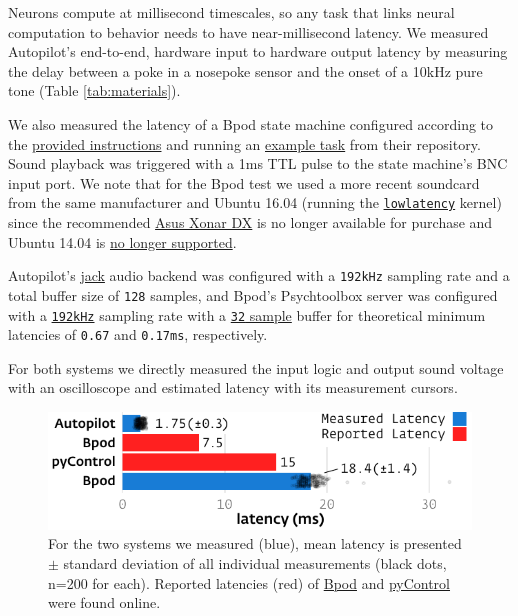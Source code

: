 Neurons compute at millisecond timescales, so any task that links neural computation to behavior needs to have near-millisecond latency. We measured Autopilot's end-to-end, hardware input to hardware output latency by measuring the delay between a poke in a nosepoke sensor and the onset of a 10kHz pure tone (Table \ref{tab:materials}). 

We also measured the latency of a Bpod state machine configured according to the \href{https://sites.google.com/site/bpoddocumentation/installing-bpod/ubuntu14}{provided instructions} and running an \href{https://github.com/sanworks/Bpod_Gen2/blob/master/Examples/Protocols/PsychToolboxSound/PsychToolboxSound.m}{example task} from their repository. Sound playback was triggered with a 1ms TTL pulse to the state machine's BNC input port. We note that for the Bpod test we used a more recent soundcard from the same manufacturer and Ubuntu 16.04 (running the \href{https://help.ubuntu.com/community/UbuntuStudio/RealTimeKernel}{\texttt{lowlatency}} kernel) since the recommended \href{https://www.asus.com/us/Sound-Cards/Xonar_DX/}{Asus Xonar DX} is no longer available for purchase and Ubuntu 14.04 is \href{https://ubuntu.com/blog/ubuntu-14-04-trusty-tahr}{no longer supported}.

Autopilot's \href{http://jackaudio.org/}{jack} audio backend was configured with a \texttt{192kHz} sampling rate and a total buffer size of \texttt{128} samples, and Bpod's Psychtoolbox server was configured with a \href{https://github.com/sanworks/Bpod_Gen2/blob/825eaf6ea2cb11da956ee21c42876c4363e9c14e/Functions/Plugins/PsychToolboxAudio/PsychToolboxAudio.m#L25}{\texttt{192kHz}} sampling rate with a \href{https://github.com/sanworks/Bpod_Gen2/blob/825eaf6ea2cb11da956ee21c42876c4363e9c14e/Functions/Plugins/PsychToolboxAudio/PsychToolboxAudio.m#L122}{\texttt{32} sample} buffer for theoretical minimum latencies of \texttt{0.67} and \texttt{0.17ms}, respectively.

For both systems we directly measured the input logic and output sound voltage with an oscilloscope and estimated latency with its measurement cursors. %
%
\begin{figure}[hb!]
\caption{For the two systems we measured (blue), mean latency is presented $\pm$ standard deviation of all individual measurements (black dots, n=200 for each). Reported latencies (red) of \href{https://sites.google.com/site/bpoddocumentation/bpod-user-guide/function-reference/psychtoolboxsoundserver}{Bpod} and \href{https://pycontrol.readthedocs.io/en/latest/user-guide/hardware/\#audio_player}{pyControl} were found online.}
\label{fig:lags}
\includegraphics{figures/test_1_lags.pdf}
\end{figure}

